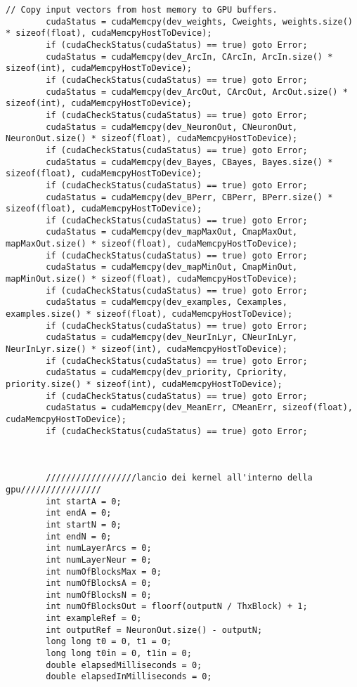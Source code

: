 \documentclass[10pt,a4paper]{article}
\begin{document}
\begin{lstlisting}[style=mycuda, caption=librerie usate, captionpos=b]
		// Copy input vectors from host memory to GPU buffers.
		cudaStatus = cudaMemcpy(dev_weights, Cweights, weights.size() * sizeof(float), cudaMemcpyHostToDevice);
		if (cudaCheckStatus(cudaStatus) == true) goto Error;
		cudaStatus = cudaMemcpy(dev_ArcIn, CArcIn, ArcIn.size() * sizeof(int), cudaMemcpyHostToDevice);
		if (cudaCheckStatus(cudaStatus) == true) goto Error;
		cudaStatus = cudaMemcpy(dev_ArcOut, CArcOut, ArcOut.size() * sizeof(int), cudaMemcpyHostToDevice);
		if (cudaCheckStatus(cudaStatus) == true) goto Error;
		cudaStatus = cudaMemcpy(dev_NeuronOut, CNeuronOut, NeuronOut.size() * sizeof(float), cudaMemcpyHostToDevice);
		if (cudaCheckStatus(cudaStatus) == true) goto Error;
		cudaStatus = cudaMemcpy(dev_Bayes, CBayes, Bayes.size() * sizeof(float), cudaMemcpyHostToDevice);
		if (cudaCheckStatus(cudaStatus) == true) goto Error;
		cudaStatus = cudaMemcpy(dev_BPerr, CBPerr, BPerr.size() * sizeof(float), cudaMemcpyHostToDevice);
		if (cudaCheckStatus(cudaStatus) == true) goto Error;
		cudaStatus = cudaMemcpy(dev_mapMaxOut, CmapMaxOut, mapMaxOut.size() * sizeof(float), cudaMemcpyHostToDevice);
		if (cudaCheckStatus(cudaStatus) == true) goto Error;
		cudaStatus = cudaMemcpy(dev_mapMinOut, CmapMinOut, mapMinOut.size() * sizeof(float), cudaMemcpyHostToDevice);
		if (cudaCheckStatus(cudaStatus) == true) goto Error;
		cudaStatus = cudaMemcpy(dev_examples, Cexamples, examples.size() * sizeof(float), cudaMemcpyHostToDevice);
		if (cudaCheckStatus(cudaStatus) == true) goto Error;
		cudaStatus = cudaMemcpy(dev_NeurInLyr, CNeurInLyr, NeurInLyr.size() * sizeof(int), cudaMemcpyHostToDevice);
		if (cudaCheckStatus(cudaStatus) == true) goto Error;
		cudaStatus = cudaMemcpy(dev_priority, Cpriority, priority.size() * sizeof(int), cudaMemcpyHostToDevice);
		if (cudaCheckStatus(cudaStatus) == true) goto Error;
		cudaStatus = cudaMemcpy(dev_MeanErr, CMeanErr, sizeof(float), cudaMemcpyHostToDevice);
		if (cudaCheckStatus(cudaStatus) == true) goto Error;



		//////////////////lancio dei kernel all'interno della gpu////////////////
		int startA = 0;
		int endA = 0;
		int startN = 0;
		int endN = 0;
		int numLayerArcs = 0;
		int numLayerNeur = 0;
		int numOfBlocksMax = 0;
		int numOfBlocksA = 0;
		int numOfBlocksN = 0;
		int numOfBlocksOut = floorf(outputN / ThxBlock) + 1;
		int exampleRef = 0;
		int outputRef = NeuronOut.size() - outputN;
		long long t0 = 0, t1 = 0;
		long long t0in = 0, t1in = 0;
		double elapsedMilliseconds = 0;
		double elapsedInMilliseconds = 0;


\end{lstlisting}
\end{document}
